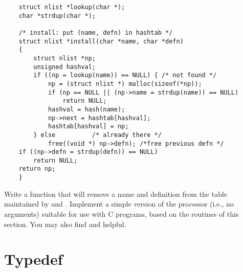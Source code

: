 \begin{lstlisting}
	struct nlist *lookup(char *);
	char *strdup(char *);

	/* install: put (name, defn) in hashtab */
	struct nlist *install(char *name, char *defn)
	{
		struct nlist *np;
		unsigned hashval;
		if ((np = lookup(name)) == NULL) { /* not found */
			np = (struct nlist *) malloc(sizeof(*np));
			if (np == NULL || (np->name = strdup(name)) == NULL)
				return NULL;
			hashval = hash(name);
			np->next = hashtab[hashval];
			hashtab[hashval] = np;
		} else 			/* already there */
			free((void *) np->defn); /*free previous defn */
	if ((np->defn = strdup(defn)) == NULL)
		return NULL;
	return np;
	}
\end{lstlisting}

\begin{ExerciseList}
\Exercise Write a function  that will remove a name and definition from the table maintained by  and .
\Exercise Implement a simple version of the  processor (i.e., no arguments) suitable for use with C programs, based on the routines of this section. You may also find  and  helpful.
\end{ExerciseList}



\section{Typedef}



